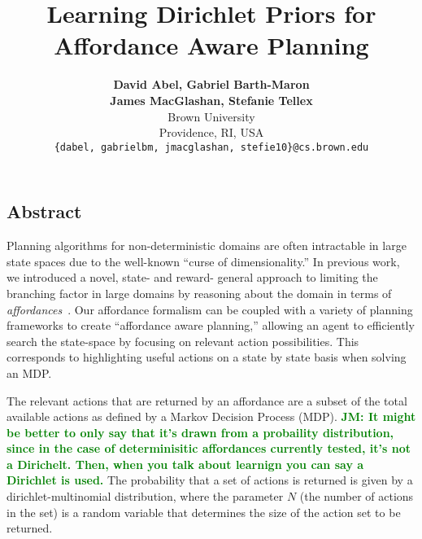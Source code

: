\documentclass[]{article}
\title{\textbf{Learning Dirichlet Priors for \\Affordance Aware Planning}}
\newcommand{\jmnote}[1]{\textcolor{Green}{\textbf{JM: #1}}}
\begin{document}
\author{
\textbf{David Abel, Gabriel Barth-Maron} \\ \textbf{James MacGlashan, Stefanie Tellex} \\
Brown University \\
Providence, RI, USA \\
\texttt{\{dabel, gabrielbm, jmacglashan, stefie10\}@cs.brown.edu}}

\date{}
\maketitle

\begin{center}
\section*{Abstract}
\end{center}
Planning algorithms for non-deterministic domains are often
intractable in large state spaces due to the well-known ``curse of
dimensionality.'' In previous work, we introduced a novel, state- and reward- general approach to limiting the
branching factor in large domains by reasoning about the
domain in terms of {\em affordances}~\citep{gibson77}.  Our affordance
formalism can be coupled with a variety of planning frameworks to
create ``affordance aware planning,'' allowing an agent to efficiently
search the state-space by focusing on relevant action possibilities. This corresponds
to highlighting useful actions on a state by state basis when solving an MDP.

The relevant actions that are returned by an affordance are a subset of
the total available actions as defined by a Markov Decision Process (MDP). \jmnote{It might be better to only say that it's drawn from a probaility distribution, since in the case of determinisitic affordances currently tested, it's not a Dirichelt. Then, when you talk about learnign you can say a Dirichlet is used.} The probability
that a set of actions is returned is given by a dirichlet-multinomial distribution, where the parameter
$N$ (the number of actions in the set) is a random variable that determines the size of the action set to be returned.
\end{document}
